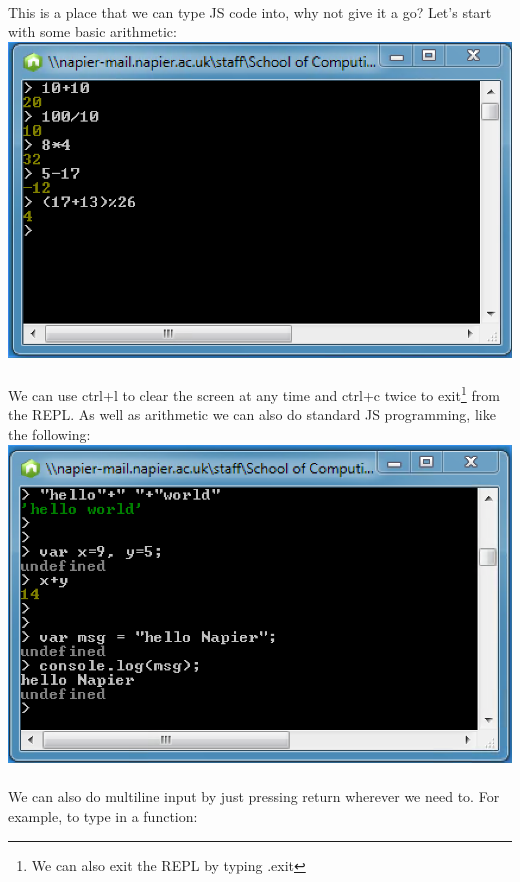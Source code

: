 \documentclass[10pt, a4paper, twosize]{article}
\begin{document}
\paragraph{} This is a place that we can type JS code into, why not give it a go? Let's start with some basic arithmetic:\\

\includegraphics[width=.8\textwidth]{images/node_repl-arithmetic}

\paragraph{} We can use ctrl+l to clear the screen at any time and ctrl+c twice to exit\footnote{We can also exit the REPL by typing .exit} from the REPL. As well as arithmetic we can also do standard JS programming, like the following:\\

\includegraphics[width=.8\textwidth]{images/node_repl-progamming}

\paragraph{} We can also do multiline input by just pressing return wherever we need to. For example, to type in a function:\\
\end{document}

